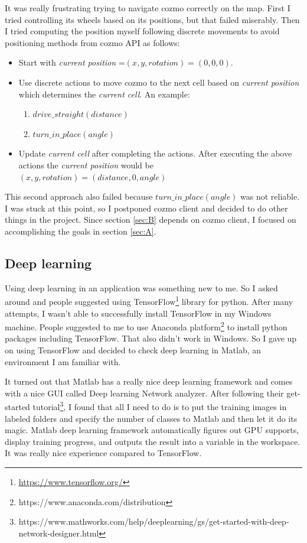 \documentclass[12pt,a4paper]{article}
\begin{document}
It was really frustrating trying to navigate cozmo correctly on the map. First I tried controlling its wheels based on its positions, but that failed miserably. Then I tried computing the position myself following discrete movements to avoid positioning methods from cozmo API as follows:
\begin{itemize}
\item Start with \textit{current position} =$(x, y, rotation) = (0, 0, 0)$.
\item Use discrete actions to move cozmo to the next cell based on \textit{current position} which determines the \textit{current cell}. An example: 
\begin{enumerate}
\item $drive\_straight(distance)$
\item $turn\_in\_place(angle)$
\end{enumerate}

\item Update \textit{current cell} after completing the actions. After executing the above actions the \textit{current position} would be $(x, y, rotation) = (distance, 0, angle)$
\end{itemize}

This second approach also failed because  $turn\_in\_place(angle)$ was not reliable. I was stuck at this point, so I postponed cozmo client and decided to do other things in the project. Since section \ref{sec:B} depends on cozmo client, I focused on accomplishing the goals in section \ref{sec:A}. 

\subsection{Deep learning}
Using deep learning in an application was something new to me. So I asked around and people suggested using 
 TensorFlow\footnote{\url{https://www.tensorflow.org/}} library for python. After many attempts, I wasn't able to successfully install TensorFlow in my Windows machine. People suggested to me to use Anaconda platform\footnote{https://www.anaconda.com/distribution} to install python packages including TensorFlow. That also didn't work in Windows. So I gave up on using TensorFlow and decided to check deep learning in Matlab, an environment I am familiar with. 
 
It turned out that Matlab has a really nice deep learning framework and comes with  a nice GUI called Deep learning Network analyzer. After following their get-started tutorial\footnote{https://www.mathworks.com/help/deeplearning/gs/get-started-with-deep-network-designer.html}, I found that all I need to do is to put the training images in labeled folders and specify the number of classes to Matlab and then let it do its magic. Matlab deep learning framework automatically figures out GPU supports, display training progress, and outputs the result into a variable in the workspace.  It was really nice experience compared to TensorFlow. 
\end{document}
